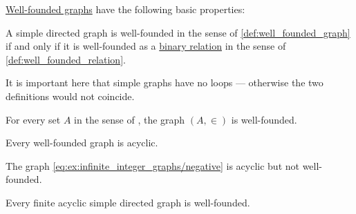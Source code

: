 \begin{proposition}\label{thm:def:well_founded_graph}
  \hyperref[def:well_founded_graph]{Well-founded graphs} have the following basic properties:
  \begin{thmenum}
     A simple directed graph is well-founded in the sense of \cref{def:well_founded_graph} if and only if it is well-founded as a \hyperref[def:binary_relation]{binary relation} in the sense of \cref{def:well_founded_relation}.

    It is important here that simple graphs have no loops --- otherwise the two definitions would not coincide.

     For every set \( A \) in the sense of \hyperref[def:zfc]{}, the graph \( (A, {\in}) \) is well-founded.

     Every well-founded graph is acyclic.

    The graph \eqref{eq:ex:infinite_integer_graphs/negative} is acyclic but not well-founded.

     Every finite acyclic simple directed graph is well-founded.
  \end{thmenum}
\end{proposition}
